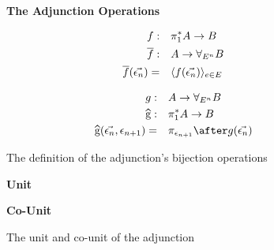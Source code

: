 \documentclass{Report}
\begin{document}
\begin{figure}
    \begin{framed}
        


        \centering
        \textbf{The Adjunction Operations}
        

        \begin{align*}
            f:&\quad \pi_1^* A \rightarrow B\\
            \overline{f}:&\quad A\rightarrow \forall_{E^n} B\\
            \overline{f}(\vec{\epsilon_n}) =&\quad \langle f(\vec{\epsilon_n})\rangle_{e\in E}
        \end{align*}
        

        \begin{align*}
            g:&\quad A \rightarrow \allEn B\\
            \widehat{g}:&\quad \pstar A\rightarrow B\\
            \widehat{g}(\env, \e_{n+1}) =&\quad\pi_{\e_{n+1}}\after g(\env)
        \end{align*}
    \end{framed}

    \caption{The definition of the adjunction's bijection operations}
    \label{AdjunctionDefinition}
\end{figure}



\begin{figure}
    \centering
    \begin{minipage}{0.47\textwidth}
      \begin{framed}
        \centering
        \textbf{Unit}
  
      \end{framed}
    \end{minipage}
    \quad
    \begin{minipage}{0.47\textwidth}
      \begin{framed}
        \centering
        \textbf{Co-Unit}
  
      \end{framed}
    \end{minipage}

\caption{The unit and co-unit of the adjunction}
    \label{UnitCoUnitDefinition}
\end{figure}
\end{document}
